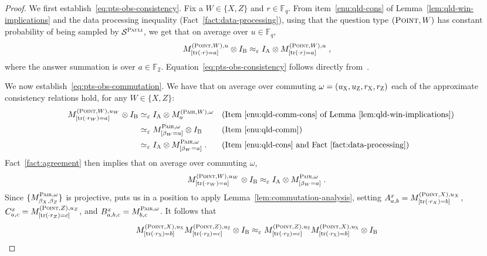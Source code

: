 \documentclass[11pt]{article}
\theoremstyle{definition}
\newcommand{\Id}{\ensuremath{I}}
\newcommand{\F}{\ensuremath{\mathbb{F}}}
\newcommand{\eps}{\varepsilon}
\DeclareMathOperator{\tr}{tr}
\newcommand{\sampler}{\mathcal{S}}
\newcommand{\gamestyle}[1]{\ensuremath{\textsc{#1}}\xspace}
\newcommand{\pauli}{\gamestyle{Pauli}}
\newcommand{\labelstyle}[1]{\ensuremath{\textsc{#1}}\xspace}
\newcommand{\xpt}{\labelstyle{X}}
\newcommand{\zpt}{\labelstyle{Z}}
\newcommand{\alice}{\labelstyle{A}}
\newcommand{\bob}{\labelstyle{B}}
\newcommand{\typestyle}[1]{\ensuremath{\textsc{#1}}\xspace}
\newcommand{\Point}{\typestyle{Point}}
\newcommand{\Pair}{\typestyle{Pair}}
\begin{document}
\begin{proof}
We first establish~\eqref{eq:pts-obs-consistency}. Fix a $W \in \{X,Z\}$ and $r \in \F_q$. From item~\ref{enu:qld-cons} of Lemma~\ref{lem:qld-win-implications} and the data processing inequality (Fact~\ref{fact:data-processing}), using that the question type $(\Point,W)$ has constant probability of being sampled by $\sampler^\pauli$, we get that on average over $u \in \F_q$,
\[
	M^{(\Point,W),u}_{[\tr(\cdot r) = a]} \otimes \Id_\bob \approx_\eps \Id_\alice \otimes M^{(\Point,W),u}_{[\tr(\cdot r) = a]}\;,
\]
where the answer summation is over $a \in \F_2$. Equation~\eqref{eq:pts-obs-consistency} follows directly from~. 

We now establish~\eqref{eq:pts-obs-commutation}. We have that on average over {commuting} $\omega = (u_\xpt,u_\zpt,r_\xpt,r_\zpt)$ each of the approximate consistency relations hold, for any $W\in\{X,Z\}$:
\begin{align*}
	&& M^{(\Point,W),u_W}_{[\tr(\cdot r_W)=a]} \otimes \Id_\bob &\simeq_\eps \Id_\alice \otimes M^{(\Pair,W),\omega}_a && \text{(Item~\ref{enu:qld-comm-cons} of Lemma~\ref{lem:qld-win-implications})}\\
	&& &\simeq_\eps M^{\Pair,\omega}_{[\beta_W = a]} \otimes \Id_\bob && \text{(Item~\ref{enu:qld-comm})} \\
	&& &\simeq_\eps \Id_\alice \otimes M^{\Pair,\omega}_{[\beta_W = a]}\;. && \text{(Item~\ref{enu:qld-cons} and Fact~\ref{fact:data-processing})}
\end{align*}
Fact~\ref{fact:agreement} then implies that on average over commuting $\omega$, 
\begin{equation}\label{eq:lc-11}
	M^{(\Point,W),u_W}_{[\tr(\cdot r_W)=a]} \otimes \Id_\bob \approx_\eps \Id_\alice \otimes M^{\Pair,\omega}_{[\beta_W = a]}\;.
\end{equation}
Since
$\{M^{\Pair,\omega}_{\beta_X,\beta_Z} \}$ is projective,
 puts us in
a position to apply Lemma~\ref{lem:commutation-analysis}, setting
$A^{x}_{a,b} = M^{(\Point, X), u_X}_{[\tr(\cdot r_X) = b]}$,
$C^{x}_{a,c} = M^{(\Point, Z), u_Z}_{[\tr(\cdot r_Z) = c]}$, and
$B^{x}_{a,b,c} = M^{\Pair, \omega}_{b,c}$. It follows that
\begin{equation}
\label{eq:qld-obs-comm}
	 M^{(\Point,X),u_\xpt}_{[\tr(\cdot r_\xpt)=b]} M^{(\Point,Z),u_\zpt}_{[\tr(\cdot r_\zpt)=c]} \otimes \Id_\bob \approx_\eps  M^{(\Point,Z),u_\zpt}_{[\tr(\cdot r_\zpt)=c]} M^{(\Point,X),u_\xpt}_{[\tr(\cdot r_\xpt)=b]}  \otimes \Id_\bob
\end{equation}

\end{proof}
\end{document}
